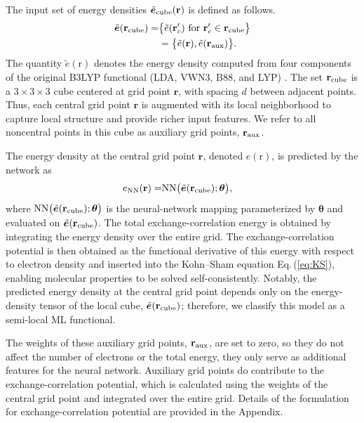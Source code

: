 \documentclass[%
twocolumn,
amsmath,
amssymb,
groupedaddress,
reprint,%
]{revtex4-2}
\newcommand{\nl}{\nonumber \\}
\newcommand{\eq}[1]{Eq.\,(\ref{#1})}
\newcommand{\brm}[1]{\bm{\mathrm{#1}}}
\begin{document}
The input set of energy densities ${\tilde{\bm{e}}_{\rm{cube}}(\brm{r})}$ is defined as follows.
% 
\begin{align}
  \tilde{\bm{e}}(\brm{r}_{\rm{cube}}) =
   & \big\{ \tilde{e}(\mathbf{r}'_{c}) \text{ for } \mathbf{r}'_{c} \in \mathbf{r}_{\rm{cube}} \big\} \nl
   & = \big\{ \tilde{e}(\mathbf{r}), \tilde{e}(\mathbf{r}_{\rm{aux}}) \big\} .
\end{align}
% 
The quantity $\tilde{e}(\brm{r})$ denotes the energy density computed from four components of the original B3LYP functional (LDA, VWN3, B88, and LYP) \cite{perdewAtomsMoleculesSolids1992-09-15}.
% 
The set $\mathbf{r}_{\rm{cube}}$ is a $3 \times 3 \times 3$ cube centered at grid point $\mathbf{r}$, with spacing $d$ between adjacent points.
%
Thus, each central grid point $\mathbf{r}$ is augmented with its local neighborhood to capture local structure and provide richer input features.
% 
We refer to all noncentral points in this cube as auxiliary grid points, $\mathbf{r}_{\rm{aux}}$.

The energy density at the central grid point $\mathbf{r}$, denoted $e(\brm{r})$, is predicted by the network as
% 
\begin{align}
  e_{\rm{NN}}(\brm{r})
  = & {\rm{NN}}\big( \tilde{\bm{e}}(\brm{r}_{\rm{cube}}); \bm{\theta} \big),
\end{align}
% 
where ${\rm{NN}}\big( \tilde{\bm{e}}(\brm{r}_{\rm{cube}}); \bm{\theta} \big)$ is the neural-network mapping parameterized by $\bm{\theta}$ and evaluated on $\tilde{\bm{e}}(\brm{r}_{\rm{cube}})$.
% 
The total exchange-correlation energy is obtained by integrating the energy density over the entire grid.
% 
The exchange-correlation potential is then obtained as the functional derivative of this energy with respect to electron density and inserted into the Kohn--Sham equation \eq{eq:KS}, enabling molecular properties to be solved self-consistently.
% 
Notably, the predicted energy density at the central grid point depends only on the energy-density tensor of the local cube, $\tilde{\bm{e}}(\brm{r}_{\rm{cube}})$; therefore, we classify this model as a semi-local ML functional.

The weights of these auxiliary grid points, $\mathbf{r}_{\rm{aux}}$, are set to zero, so they do not affect the number of electrons or the total energy, they only serve as additional features for the neural network.
% 
Auxiliary grid points do contribute to the exchange-correlation potential, which is calculated using the weights of the central grid point and integrated over the entire grid.
% 
Details of the formulation for exchange-correlation potential are provided in the Appendix.
\end{document}
